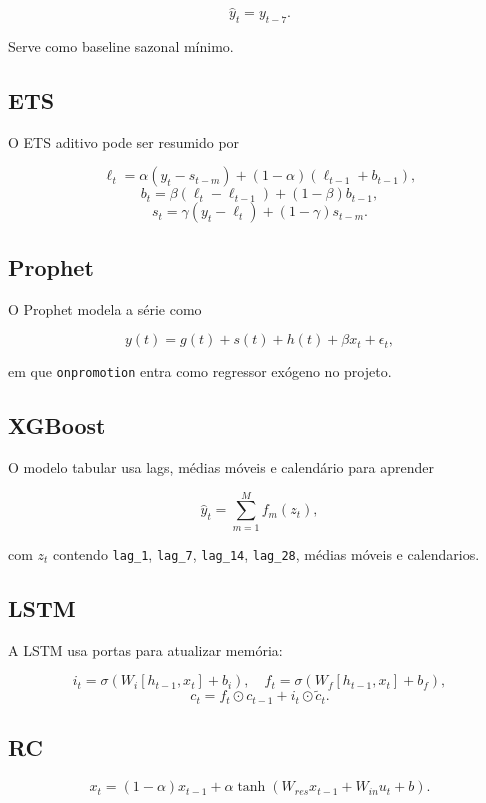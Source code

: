 \documentclass[12pt]{article}
\begin{document}
\[
\hat{y}_t = y_{t-7}.
\]

Serve como baseline sazonal mínimo.

\subsection{ETS}\label{42-ets}

O ETS aditivo pode ser resumido por

\[
\ell_t = \alpha (y_t - s_{t-m}) + (1 - \alpha)(\ell_{t-1} + b_{t-1}),
\]
\[
b_t = \beta (\ell_t - \ell_{t-1}) + (1 - \beta) b_{t-1},
\]
\[
s_t = \gamma (y_t - \ell_t) + (1 - \gamma) s_{t-m}.
\]

\subsection{Prophet}\label{43-prophet}

O Prophet modela a série como

\[
y(t) = g(t) + s(t) + h(t) + \beta x_t + \epsilon_t,
\]

em que \texttt{onpromotion} entra como regressor exógeno no projeto.

\subsection{XGBoost}\label{44-xgboost}

O modelo tabular usa lags, médias móveis e calendário para aprender

\[
\hat{y}_t = \sum_{m=1}^M f_m(z_t),
\]

com \(z_t\) contendo \texttt{lag\_1}, \texttt{lag\_7}, \texttt{lag\_14}, \texttt{lag\_28}, médias móveis e calendarios.

\subsection{LSTM}\label{45-lstm}

A LSTM usa portas para atualizar memória:

\[
i_t = \sigma(W_i [h_{t-1}, x_t] + b_i), \quad
f_t = \sigma(W_f [h_{t-1}, x_t] + b_f),
\]
\[
c_t = f_t \odot c_{t-1} + i_t \odot \tilde{c}_t.
\]

\subsection{RC}\label{46-rc}

\[
x_t = (1 - \alpha) x_{t-1} + \alpha \tanh(W_{res} x_{t-1} + W_{in} u_t + b).
\]
\end{document}
